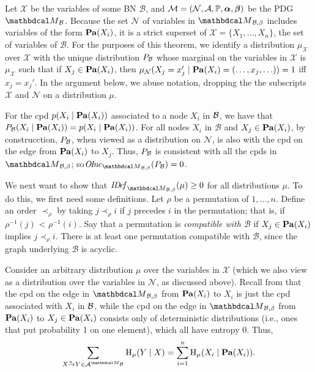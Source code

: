 \begin{subappendices}
Let $\mathcal X$ be the variables of some BN $\mathcal B$, and
$\mathcal M = (\N, \Ar, \mathbb P, \balpha, \bbeta)$ 
be the PDG $\PDGof{\mathcal B}$.
Because the set  $\mathcal N$ of variables in $\PDGof{{\mathcal
    B},\beta}$ includes  
variables of the form $\Pa(X_i)$, it is a strict superset of
$\mathcal X = \{X_1,\ldots, X_n\}$, the set of variables of $\mathcal B$.
For the purposes of this theorem, we identify a distribution
$\mu_{\mathcal X}$ over $\mathcal X$ 
with the unique distribution $\Pr_{\cal B}$ whose marginal on the
variables in $\mathcal X$ is $\mu_{\mathcal X}$ such that if $X_j \in
\Pa(X_i)$, then 
$\mu_{\mathcal N}(X_j = x_j' \mid \Pa(X_i) = (\ldots, x_j,\ldots)) =
1$ iff $x_j = x_j'$.  In the argument below, we abuse notation,
dropping the the subscripts $\mathcal X$ and $\mathcal N$ on a
distribution $\mu$.

\begin{lproof}\label{proof:bns-are-pdgs}
  For the cpd $p(X_i \mid \Pa(X_i))$ associated to a node $X_i$ in 
$\cal B$, we have that $\Pr_{\cal B}(X_i
\mid \Pa(X_i)) = p(X_i \mid \Pa(X_i))$.  
For all nodes $X_i$ in $\mathcal B$ and $X_j \in \Pa(X_i)$, 
by construcction, $\Pr_{\cal B}$, when viewed as a distribution on
$\mathcal N$, is also with the cpd on the edge from $\Pa(X_i)$ to
$X_j$.
Thus, $\Pr_{\cal B}$ is consistent with all the cpds in
$\PDGof{\mathcal B, \beta}$;
so$\OInc_{\PDGof{\mathcal B,\beta}}(\Pr_{\cal B}) = 0$.

We next want to show  that $\IDef_{\PDGof{\mathcal B,\beta}}(\mu) \ge 0$ for all
distributions $\mu$.  To do this, we first need some definitions.
Let $\rho$ be a permutation of $1, \ldots,  n$.  Define an order
$\prec_{\rho}$ by taking $j \prec_{\rho} i$ if $j$ precedes $i$ in the
permutation; that is, if 
$\rho^{-1}(j)$ < $\rho^{-1}(i)$. Say that a permutation is \emph{compatible with
  $\mathcal B$} if $X_j \in \Pa(X_i)$ implies $j \prec_{\rho} i$.   There
is at least one permutation compatible with $\mathcal B$, since 
the graph underlying $\mathcal B$ is acyclic.
  
Consider an arbitrary distribution $\mu$ over the variables in
$\mathcal X$ (which we also view as a distribution over the variables
in $\mathcal N$, as discussed above).
Recall from 
that the cpd on the edge in $\PDGof{{\cal B},\beta}$ from $\Pa(X_i)$ to $X_i$
is just the cpd associated with $X_i$ in ${\cal B}$, while the cpd on
the edge in $\PDGof{{\cal B},\beta}$ from $\Pa(X_i)$ to $X_j \in \Pa(X_i)$
consists only of deterministic distributions (i.e., ones that put
probability 1 on one element), which all have entropy 0.  
Thus,
\begin{equation}\label{eq:fact2}
\sum_{\ed aXY \in \Ar^{\PDGof{\mathcal B}}} \H_\mu(Y\mid
X)=\sum_{i=1}^n \H_\mu(X_i \mid \Pa(X_i)). 
\end{equation}


\end{lproof}
\end{subappendices}

